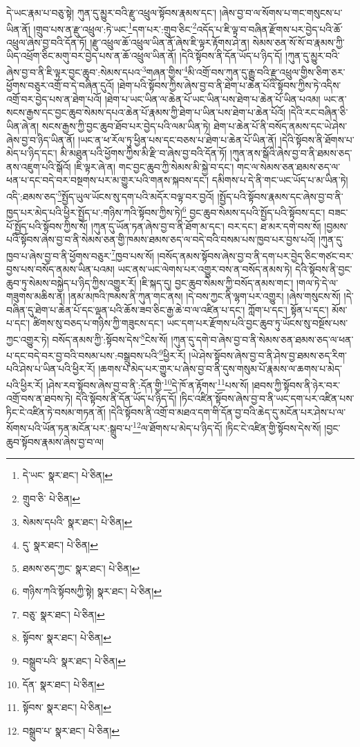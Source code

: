 དེ་ཡང་རྣམ་པ་བཅུ་སྟེ། ཀུན་དུ་མྱུར་བའི་རྫུ་འཕྲུལ་སྟོབས་རྣམས་དང་། །ཞེས་བྱ་བ་ལ་སོགས་པ་གང་གསུངས་པ་ཡིན་ནོ། །གྲུབ་པས་ན་རྫུ་འཕྲུལ་:ཏེ་ཡང་\footnote{དེ་ཡང་  སྣར་ཐང་།  པེ་ཅིན། }དག་པར་:གྲུབ་ཅིང་\footnote{གྲུབ་ཅི་  པེ་ཅིན། }འདོད་པ་ཇི་ལྟ་བ་བཞིན་རྫོགས་པར་བྱེད་པའི་ཆོ་འཕྲུལ་ཞེས་བྱ་བའི་དོན་ཏོ། །རྫུ་འཕྲུལ་ཆོ་འཕྲུལ་ཡིན་ནོ་ཞེས་ཇི་ལྟར་རྟོགས་ཤེ་ན། སེམས་ཅན་སོ་སོ་བ་རྣམས་ཀྱི་ཡིད་འཕྲོག་ཅིང་མགུ་བར་བྱེད་པས་ན་ཆོ་འཕྲུལ་ཡིན་ནོ། །དེའི་སྟོབས་ནི་དོན་ཡོད་པ་ཉིད་དོ། །ཀུན་དུ་མྱུར་བའི་ཞེས་བྱ་བ་ནི་ཇི་ལྟར་བྱང་ཆུབ་:སེམས་དཔའ་\footnote{སེམས་དཔའི་  སྣར་ཐང་།  པེ་ཅིན། }གཞན་གྱིས་\footnote{དུ་  སྣར་ཐང་།  པེ་ཅིན། }མི་འགྲོ་བས་ཀུན་དུ་རྒྱུ་བའི་རྫུ་འཕྲུལ་གྱིས་ཅིག་ཅར་ཕྱོགས་བཅུར་འགྲོ་བ་དེ་བཞིན་དུའོ། །ཐེག་པའི་སྟོབས་ཀྱིས་ཞེས་བྱ་བ་ནི་ཐེག་པ་ཆེན་པོའི་སྟོབས་ཀྱིས་ཏེ་འདིས་འགྲོ་བར་བྱེད་པས་ན་ཐེག་པའོ། །ཐེག་པ་ཡང་ཡིན་ལ་ཆེན་པོ་ཡང་ཡིན་པས་ཐེག་པ་ཆེན་པོ་ཡིན་པའམ། ཡང་ན་སངས་རྒྱས་དང་བྱང་ཆུབ་སེམས་དཔའ་ཆེན་པོ་རྣམས་ཀྱི་ཐེག་པ་ཡིན་པས་ཐེག་པ་ཆེན་པོའོ། །དེའི་རང་བཞིན་ཅི་ཡིན་ཞེ་ན། སངས་རྒྱས་ཀྱི་བྱང་ཆུབ་ཐོབ་པར་བྱེད་པའི་ལམ་ཡིན་ཏེ། ཐེག་པ་ཆེན་པོ་ནི་བསོད་ནམས་དང་ཡེ་ཤེས་ཞེས་བྱ་བ་ཉིད་ཡིན་ནོ། །ཡང་ན་ཕ་རོལ་ཏུ་ཕྱིན་པས་དང་བཅས་པ་ཐེག་པ་ཆེན་པོ་ཡིན་ནོ། །དེའི་སྟོབས་ནི་ཐོགས་པ་མེད་པ་ཉིད་དང་། མི་མཐུན་པའི་ཕྱོགས་ཀྱིས་མི་རྫི་བ་ཞེས་བྱ་བའི་དོན་ཏོ། །ཀུན་ནས་སྒོའི་ཞེས་བྱ་བ་ནི་ཐམས་ཅད་ནས་འཇུག་པའི་སྒོའོ། །ཇི་ལྟར་ཞེ་ན། གང་བྱང་ཆུབ་ཀྱི་སེམས་མི་སྐྱེ་བ་དང་། གང་ལ་སེམས་ཅན་ཐམས་ཅད་ལ་ཕན་པ་དང་བདེ་བར་བསྔགས་པར་མ་གྱུར་པའི་གནས་སྐབས་དང་། དམིགས་པ་དེ་ནི་གང་ཡང་ཡོད་པ་མ་ཡིན་ཏེ། འདི་:ཐམས་ཅད་\footnote{ཐམས་ཅད་ཀྱང་  སྣར་ཐང་།  པེ་ཅིན། }སྤྱོད་ཡུལ་ཡོངས་སུ་དག་པའི་མདོར་བལྟ་བར་བྱའོ། །སྤྱོད་པའི་སྟོབས་རྣམས་དང་ཞེས་བྱ་བ་ནི་ཁྱད་པར་མེད་པའི་ཕྱིར་སྤྱོད་པ་:གཉིས་ཀའི་སྟོབས་ཀྱིས་ཏེ།\footnote{གཉིས་ཀའི་སྟོབསཀྱི་སྟེ།  སྣར་ཐང་།  པེ་ཅིན། } བྱང་ཆུབ་སེམས་དཔའི་སྤྱོད་པའི་སྟོབས་དང་། བཟང་པོ་སྤྱོད་པའི་སྟོབས་ཀྱིས་སོ། །ཀུན་དུ་ཡོན་ཏན་ཞེས་བྱ་བ་ནི་ཐོག་མ་དང་། བར་དང་། ཐ་མར་དགེ་བས་སོ། །བྱམས་པའི་སྟོབས་ཞེས་བྱ་བ་ནི་སེམས་ཅན་གྱི་ཁམས་ཐམས་ཅད་ལ་བདེ་བའི་བསམ་པས་ཁྱབ་པར་བྱས་པའོ། །ཀུན་དུ་ཁྱབ་པ་ཞེས་བྱ་བ་ནི་ཕྱོགས་བཅུར་\footnote{བཅུ་  སྣར་ཐང་།  པེ་ཅིན། }ཁྱབ་པས་སོ། །བསོད་ནམས་སྟོབས་ཞེས་བྱ་བ་ནི་དག་པར་བྱེད་ཅིང་གཙང་བར་བྱས་པས་བསོད་ནམས་ཡིན་པའམ། ཡང་ནས་ཡང་ལེགས་པར་འགྱུར་བས་ན་བསོད་ནམས་ཏེ། དེའི་སྟོབས་ནི་བྱང་ཆུབ་ཏུ་སེམས་བསྐྱེད་པ་ཉིད་ཀྱིས་འགྱུར་རོ། །ཇི་སྐད་དུ། བྱང་ཆུབ་སེམས་ཀྱི་བསོད་ནམས་གང་། །གལ་ཏེ་དེ་ལ་གཟུགས་མཆིས་ན། །ནམ་མཁའི་ཁམས་ནི་ཀུན་གང་ནས། །དེ་བས་ཀྱང་ནི་ལྷག་པར་འགྱུར། །ཞེས་གསུངས་སོ། །དེ་བཞིན་དུ་ཐེག་པ་ཆེན་པོ་དང་ལྡན་པའི་ཆོས་ཟབ་ཅིང་རྒྱ་ཆེ་བ་ལ་འཛིན་པ་དང་། ཀློག་པ་དང་། སྟོན་པ་དང་། མོས་པ་དང་། ཚིགས་སུ་བཅད་པ་གཉིས་ཀྱི་གཟུངས་དང་། ཡང་དག་པར་རྫོགས་པའི་བྱང་ཆུབ་ཏུ་ཡོངས་སུ་བསྔོས་པས་ཀྱང་འགྱུར་ཏེ། བསོད་ནམས་ཀྱི་:སྟོབས་དེས་\footnote{སྟོབས་  སྣར་ཐང་།  པེ་ཅིན། }ངེས་སོ། །ཀུན་དུ་དགེ་བ་ཞེས་བྱ་བ་ནི་སེམས་ཅན་ཐམས་ཅད་ལ་ཕན་པ་དང་བདེ་བར་བྱ་བའི་བསམ་པས་:བསྒྲུབས་པའི་\footnote{བསྒྲུབ་པའི་  སྣར་ཐང་།  པེ་ཅིན། }ཕྱིར་རོ། །ཡེ་ཤེས་སྟོབས་ཞེས་བྱ་བ་ནི་ཤེས་བྱ་ཐམས་ཅད་རིག་པའི་ཤེས་པ་ཡིན་པའི་ཕྱིར་རོ། །ཆགས་པ་མེད་པར་གྱུར་པ་ཞེས་བྱ་བ་ནི་དུས་གསུམ་པོ་རྣམས་ལ་ཆགས་པ་མེད་པའི་ཕྱིར་རོ། །ཤེས་རབ་སྟོབས་ཞེས་བྱ་བ་ནི་:དོན་གྱི་\footnote{དོན་  སྣར་ཐང་།  པེ་ཅིན། }དེ་ཁོ་ན་རྟོགས་\footnote{སྟོབས་  སྣར་ཐང་།  པེ་ཅིན། }པས་སོ། །ཐབས་ཀྱི་སྟོབས་ནི་ཉེར་བར་འགྲོ་བས་ན་ཐབས་ཏེ། དེའི་སྟོབས་ནི་དོན་ཡོད་པ་ཉིད་དོ། །ཏིང་འཛིན་སྟོབས་ཞེས་བྱ་བ་ནི་ཡང་དག་པར་འཛིན་པས་ཏིང་ངེ་འཛིན་ཏེ་བསམ་གཏན་ནོ། །དེའི་སྟོབས་ནི་འགྲོ་བ་མཐའ་དག་གི་དོན་བྱ་བའི་ཆེད་དུ་མངོན་པར་ཤེས་པ་ལ་སོགས་པའི་ཡོན་ཏན་མངོན་པར་:སྒྲུབ་པ་\footnote{བསྒྲུབ་པ་  སྣར་ཐང་།  པེ་ཅིན། }ལ་ཐོགས་པ་མེད་པ་ཉིད་དོ། །ཏིང་ངེ་འཛིན་གྱི་སྟོབས་དེས་སོ། །བྱང་ཆུབ་སྟོབས་རྣམས་ཞེས་བྱ་བ་ལ། 